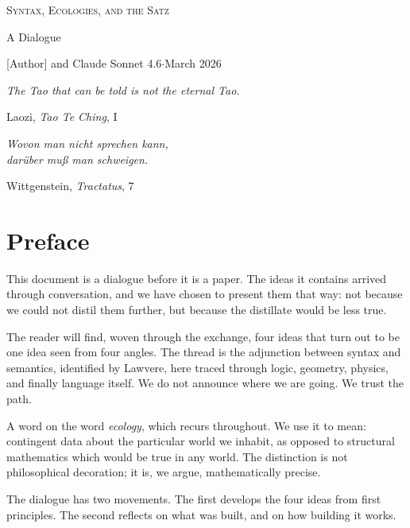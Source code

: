 \documentclass[11pt]{article}
\begin{document}
\begin{center}
{\LARGE\scshape Syntax, Ecologies, and the Satz}

\bigskip
{\large A Dialogue}

\bigskip
{\normalsize [Author] and Claude Sonnet 4.6\quad$\cdot$\quad March 2026}
\end{center}

\bigskip\bigskip

\epigraph{\itshape
  The Tao that can be told is not the eternal Tao.
}{Laozi, \textit{Tao Te Ching}, I}

\epigraph{\itshape
  Wovon man nicht sprechen kann,\\
  dar\"uber mu\ss{} man schweigen.
}{Wittgenstein, \textit{Tractatus}, 7}

\bigskip

\section*{Preface}

This document is a dialogue before it is a paper. The ideas it contains
arrived through conversation, and we have chosen to present them that way:
not because we could not distil them further, but because the distillate
would be less true.

The reader will find, woven through the exchange, four ideas that turn out
to be one idea seen from four angles. The thread is the adjunction between
syntax and semantics, identified by Lawvere, here traced through logic,
geometry, physics, and finally language itself. We do not announce where
we are going. We trust the path.

A word on the word \textit{ecology}, which recurs throughout. We use it
to mean: contingent data about the particular world we inhabit, as opposed
to structural mathematics which would be true in any world. The distinction
is not philosophical decoration; it is, we argue, mathematically precise.

The dialogue has two movements. The first develops the four ideas from
first principles. The second reflects on what was built, and on how
building it works.
\end{document}
